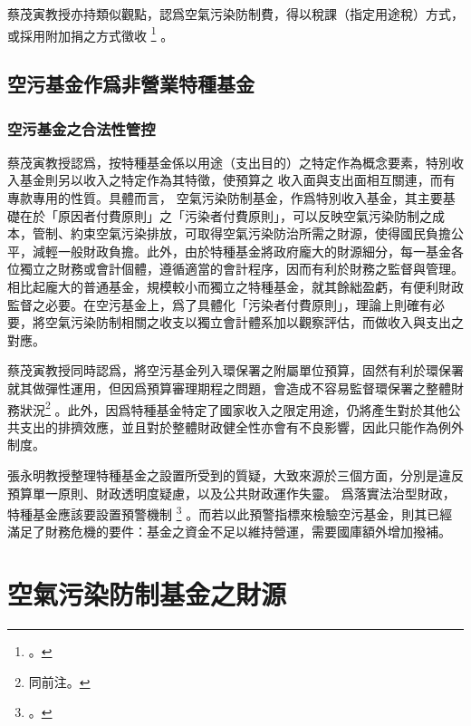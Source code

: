 \documentclass[12pt,a4paper]{article}
\begin{document}
蔡茂寅教授亦持類似觀點，認爲空氣污染防制費，得以稅課（指定用途稅）方式，或採用附加捐之方式徵收
\footnote{。}
。



\subsection{空污基金作爲非營業特種基金}


\subsubsection{空污基金之合法性管控}

蔡茂寅教授認爲，按特種基金係以用途（支出目的）之特定作為概念要素，特別收入基金則另以收入之特定作為其特徵，使預算之 收入面與支出面相互關連，而有專款專用的性質。具體而言，
空氣污染防制基金，作爲特別收入基金，其主要基礎在於「原因者付費原則」之「污染者付費原則」，可以反映空氣污染防制之成本，管制、約束空氣污染排放，可取得空氣污染防治所需之財源，使得國民負擔公平，減輕一般財政負擔。此外，由於特種基金將政府龐大的財源細分，每一基金各位獨立之財務或會計個體，遵循適當的會計程序，因而有利於財務之監督與管理。相比起龐大的普通基金，規模較小而獨立之特種基金，就其餘絀盈虧，有便利財政監督之必要。在空污基金上，爲了具體化「污染者付費原則」，理論上則確有必要，將空氣污染防制相關之收支以獨立會計體系加以觀察評估，而做收入與支出之對應。

蔡茂寅教授同時認爲，將空污基金列入環保署之附屬單位預算，固然有利於環保署就其做彈性運用，但因爲預算審理期程之問題，會造成不容易監督環保署之整體財務狀況\footnote{同前注。}
。此外，因爲特種基金特定了國家收入之限定用途，仍將產生對於其他公共支出的排擠效應，並且對於整體財政健全性亦會有不良影響，因此只能作為例外制度。


張永明教授整理特種基金之設置所受到的質疑，大致來源於三個方面，分別是違反預算單一原則、財政透明度疑慮，以及公共財政運作失靈。
爲落實法治型財政，特種基金應該要設置預警機制
\footnote{。}
。而若以此預警指標來檢驗空污基金，則其已經滿足了財務危機的要件：基金之資金不足以維持營運，需要國庫額外增加撥補。


\pagebreak

\section{空氣污染防制基金之財源}
\end{document}
